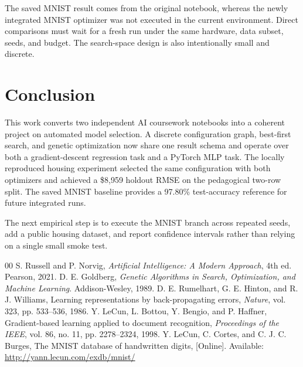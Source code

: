 \documentclass[conference]{IEEEtran}
\begin{document}
The saved MNIST result comes from the original notebook, whereas the newly integrated MNIST optimizer was not executed in the current environment. Direct comparisons must wait for a fresh run under the same hardware, data subset, seeds, and budget. The search-space design is also intentionally small and discrete.

\section{Conclusion}
This work converts two independent AI coursework notebooks into a coherent project on automated model selection. A discrete configuration graph, best-first search, and genetic optimization now share one result schema and operate over both a gradient-descent regression task and a PyTorch MLP task. The locally reproduced housing experiment selected the same configuration with both optimizers and achieved a \$8,959 holdout RMSE on the pedagogical two-row split. The saved MNIST baseline provides a 97.80\% test-accuracy reference for future integrated runs.

The next empirical step is to execute the MNIST branch across repeated seeds, add a public housing dataset, and report confidence intervals rather than relying on a single small smoke test.

\begin{thebibliography}{00}
 S. Russell and P. Norvig, \textit{Artificial Intelligence: A Modern Approach}, 4th ed. Pearson, 2021.
 D. E. Goldberg, \textit{Genetic Algorithms in Search, Optimization, and Machine Learning}. Addison-Wesley, 1989.
 D. E. Rumelhart, G. E. Hinton, and R. J. Williams, Learning representations by back-propagating errors, \textit{Nature}, vol. 323, pp. 533--536, 1986.
 Y. LeCun, L. Bottou, Y. Bengio, and P. Haffner, Gradient-based learning applied to document recognition, \textit{Proceedings of the IEEE}, vol. 86, no. 11, pp. 2278--2324, 1998.
 Y. LeCun, C. Cortes, and C. J. C. Burges, The MNIST database of handwritten digits, [Online]. Available: \url{http://yann.lecun.com/exdb/mnist/}
\end{thebibliography}
\end{document}
